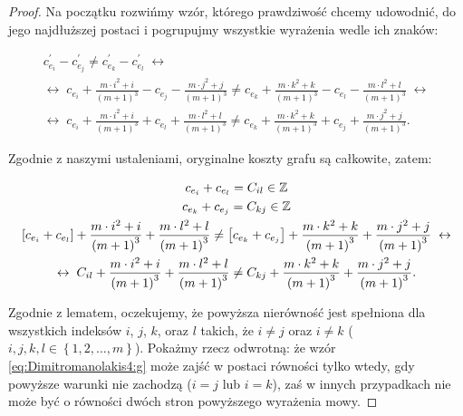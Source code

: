 \begin{proof}
	Na początku rozwińmy wzór, którego prawdziwość chcemy udowodnić, do jego najdłuższej postaci i pogrupujmy wszystkie wyrażenia wedle ich znaków:
	
	\begin{gather}
		c^{\prime}_{e_{i}} - c^{\prime}_{e_{j}} \neq c^{\prime}_{e_{k}} - c^{\prime}_{e_{l}} \; \leftrightarrow \\
		\leftrightarrow \; c_{e_{i}} + \frac{m \cdot i^{2} + i}{\left( m + 1 \right)^{3}} - c_{e_{j}} - \frac{m \cdot j^{2} + j}{\left( m + 1 \right)^{3}} \neq c_{e_{k}} + \frac{m \cdot k^{2} + k}{\left( m + 1 \right)^{3}} - c_{e_{l}} - \frac{m \cdot l^{2} + l}{\left( m + 1 \right)^{3}} \; \leftrightarrow \\
		\leftrightarrow \; c_{e_{i}} + \frac{m \cdot i^{2} + i}{\left( m + 1 \right)^{3}} + c_{e_{l}} + \frac{m \cdot l^{2} + l}{\left( m + 1 \right)^{3}} \neq c_{e_{k}} + \frac{m \cdot k^{2} + k}{\left( m + 1 \right)^{3}} + c_{e_{j}} + \frac{m \cdot j^{2} + j}{\left( m + 1 \right)^{3}}\text{.}
	\end{gather}
	
	Zgodnie z naszymi ustaleniami, oryginalne koszty grafu są całkowite, zatem:
	
	\begin{gather}
		c_{e_{i}} + c_{e_{l}} = C_{il} \in \mathbb{Z} \\
		c_{e_{k}} + c_{e_{j}} = C_{kj} \in \mathbb{Z} \\
		\left[ c_{e_{i}} + c_{e_{l}} \right] + \frac{m \cdot i^{2} + i}{\left( m + 1 \right)^{3}} + \frac{m \cdot l^{2} + l}{\left( m + 1 \right)^{3}} \neq \left[ c_{e_{k}} + c_{e_{j}} \right] + \frac{m \cdot k^{2} + k}{\left( m + 1 \right)^{3}} + \frac{m \cdot j^{2} + j}{\left( m + 1 \right)^{3}} \; \leftrightarrow \\
		\leftrightarrow \; C_{il} + \frac{m \cdot i^{2} + i}{\left( m + 1 \right)^{3}} + \frac{m \cdot l^{2} + l}{\left( m + 1 \right)^{3}} \neq C_{kj} + \frac{m \cdot k^{2} + k}{\left( m + 1 \right)^{3}} + \frac{m \cdot j^{2} + j}{\left( m + 1 \right)^{3}}\label{eq:Dimitromanolakis4:g}\text{.}
	\end{gather}
	
	Zgodnie z lematem, oczekujemy, że powyższa nierówność jest spełniona dla wszystkich indeksów $i$, $j$, $k$, oraz $l$ takich, że $i \neq j$ oraz $i \neq k$ ($i, j, k, l \in \left\{ 1, 2, \dots, m \right\}$). Pokażmy rzecz odwrotną: że wzór \ref{eq:Dimitromanolakis4:g} może zajść w postaci równości tylko wtedy, gdy powyższe warunki nie zachodzą ($i = j$ lub $i = k$), zaś w innych przypadkach nie może być o równości dwóch stron powyższego wyrażenia mowy.
	

\end{proof}
